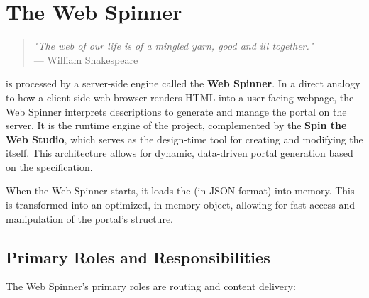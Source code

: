 
\chapter{The Web Spinner}
\label{chap:web-spinner}

\begin{quote}
	\textit{"The web of our life is of a mingled yarn, good and ill together."} \\
— William Shakespeare
\end{quote}

\wbdl{} is processed by a server-side engine called the \textbf{Web Spinner}. In a direct analogy to how a client-side web browser renders HTML into a user-facing webpage, the Web Spinner interprets \wbdl{} descriptions to generate and manage the portal on the server. It is the runtime engine of the project, complemented by the \textbf{Spin the Web Studio}, which serves as the design-time tool for creating and modifying the \webbase{} itself. This architecture allows for dynamic, data-driven portal generation based on the \wbdl{} specification.

When the Web Spinner starts, it loads the \webbase{} (in JSON format) into memory. This \webbase{} is transformed into an optimized, in-memory object, allowing for fast access and manipulation of the portal's structure.

\section{Primary Roles and Responsibilities}
\label{sec:primary-roles}

The Web Spinner's primary roles are routing and content delivery:

